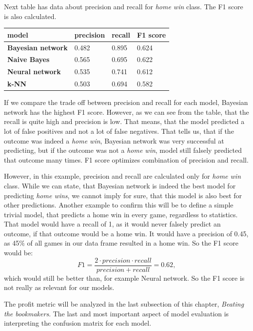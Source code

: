 \documentclass[conference]{IEEEtran}
\begin{document}
Next table has data about precision and recall for \textit{home win} class. The F1 score is also
calculated.

\begin{table}[!ht]
    \centering
    \begin{tabular}{llll}
        model & precision & recall & F1 score \\ \hline
        \textbf{Bayesian network} & 0.482 & 0.895 & 0.624 \\ 
        \textbf{Naive Bayes} & 0.565 & 0.695 & 0.622 \\ 
        \textbf{Neural network} & 0.535 & 0.741 & 0.612 \\ 
        \textbf{k-NN} & 0.503 & 0.694 & 0.582 \\ 
    \end{tabular}
\end{table}


If we compare the trade off between precision and recall for each model, Bayesian network
has the highest F1 score. However, as we can see from the table, that the recall is quite high and
precision is low. That means, that the model predicted a lot of false positives and not a lot 
of false negatives. That tells us, that if the outcome was indeed a \textit{home win},
Bayesian network was very successful at predicting, but if the outcome was not a \textit{home
win}, model still falsely predicted that outcome many times. F1 score optimizes combination 
of precision and recall. 

However, in this example, precision and recall are calculated only for \textit{home win}
class. While we can state, that Bayesian network is indeed the best model for predicting 
\textit{home wins}, we cannot imply for sure, that this model is also best for other predictions.
Another example to confirm this will be to define a simple trivial model, that predicts a 
home win in every game, regardless to statistics. That model would have a recall of 1, as it
would never falsely predict an outcome, if that outcome would be a home win. It would have
a precision of 0.45, as 45\% of all games in our data frame resulted in a home win. So the F1
score would be: $$F1 = \frac{2 \cdot precision \cdot recall}{precision + recall} = 0.62,$$
which would still be better than, for example Neural network. So the F1 score is not really
as relevant for our models.

The profit metric will be analyzed in the last subsection of this chapter, \textit{Beating the
bookmakers}. The last and most important aspect of model evaluation is interpreting the 
confusion matrix for each model. 
\end{document}
